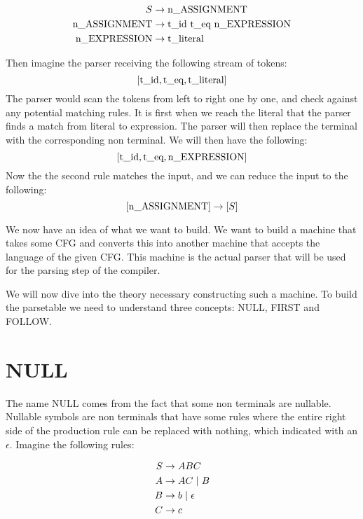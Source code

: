 \begin{equation*}
  \begin{split}
      S &\rightarrow \text{n\textunderscore ASSIGNMENT} \\
      \text{n\textunderscore ASSIGNMENT} &\rightarrow \text{\text{t\textunderscore id}   \text{t\textunderscore eq}   \text{n\textunderscore EXPRESSION}} \\
      \text{n\textunderscore EXPRESSION} &\rightarrow \text{t\textunderscore literal} \\
  \end{split}
\end{equation*}

Then imagine the parser receiving the following stream of tokens:
\[[\text{t\textunderscore id}, \text{t\textunderscore eq}, \text{t\textunderscore literal}]\]
The parser would scan the tokens from left to right one by one, and check against any potential matching rules. It is first when we reach the literal that the parser finds a match from literal to expression. The parser will then replace the terminal with the corresponding non terminal. We will then have the following: 
\[[\text{t\textunderscore id}, \text{t\textunderscore eq}, \text{n\textunderscore EXPRESSION}]\]
Now the the second rule matches the input, and we can reduce the input to the following:
\[[\text{n\textunderscore ASSIGNMENT}] \rightarrow [S]\]

We now have an idea of what we want to build. We want to build a machine that takes some CFG and converts this into another machine that accepts the language of the given CFG. This machine is the actual parser that will be used for the parsing step of the compiler.

We will now dive into the theory necessary constructing such a machine. To build the parsetable we need to understand three concepts: NULL, FIRST and FOLLOW.

\section*{NULL}

The name NULL comes from the fact that some non terminals are nullable. Nullable symbols are non terminals that have some rules where the entire right side of the production rule can be replaced with nothing, which indicated with an $\epsilon$. Imagine the following rules:

\begin{equation*}
  \begin{split}
      S &\rightarrow ABC \\
      A &\rightarrow AC \hspace*{3px}|\hspace*{3px}B\\
      B &\rightarrow b \hspace*{3px}|\hspace*{3px}\epsilon \\
      C &\rightarrow c
  \end{split}
\end{equation*}

